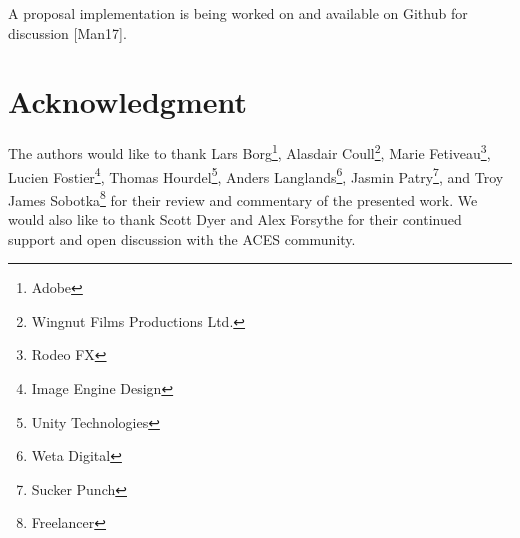 \documentclass[conference]{IEEEtran}
\begin{document}
A proposal implementation is being worked on and available on Github for discussion [Man17].

\section*{Acknowledgment}
The authors would like to thank Lars Borg\footnote{Adobe}, Alasdair Coull\footnote{Wingnut Films Productions Ltd.}, Marie Fetiveau\footnote{Rodeo FX}, Lucien Fostier\footnote{Image Engine Design}, Thomas Hourdel\footnote{Unity Technologies}, Anders Langlands\footnote{Weta Digital}, Jasmin Patry\footnote{Sucker Punch}, and Troy James Sobotka\footnote{Freelancer} for their review and commentary of the presented work. We would also like to thank Scott Dyer and Alex Forsythe for their continued support and open discussion with the ACES community.

\clearpage
\end{document}
